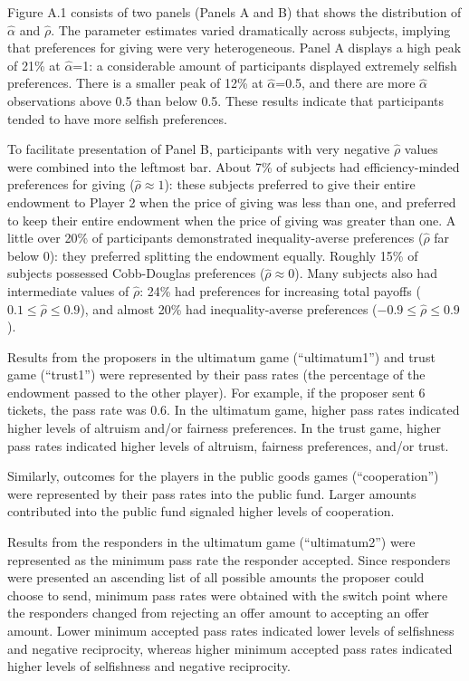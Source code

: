 \documentclass[12pt]{article}
\begin{document}
Figure A.1 consists of two panels (Panels A and B) that shows the distribution of  \(\hat{\alpha}\) and \(\hat{\rho}\). The parameter estimates varied dramatically across subjects, implying that preferences for giving were very heterogeneous. Panel A displays a high peak of 21\% at \(\hat{\alpha}\)=1: a considerable amount of participants displayed extremely selfish preferences. There is a smaller peak of 12\% at \(\hat{\alpha}\)=0.5, and there are more \(\hat{\alpha}\) observations above 0.5 than below 0.5. These results indicate that participants tended to have more selfish preferences. 

To facilitate presentation of Panel B, participants with very negative \(\hat{\rho}\) values were combined into the leftmost bar. About 7\% of subjects had efficiency-minded preferences for giving (\(\hat{\rho} \approx 1\)): these subjects preferred to give their entire endowment to Player 2 when the price of giving was less than one, and preferred to keep their entire endowment when the price of giving was greater than one. A little over 20\% of participants demonstrated inequality-averse preferences (\(\hat{\rho}\) far below 0): they preferred splitting the endowment equally. Roughly 15\% of subjects possessed Cobb-Douglas preferences (\(\hat{\rho} \approx 0\)). Many subjects also had intermediate values of \(\hat{\rho}\): 24\% had preferences for increasing total payoffs (\(0.1 \leq \hat{\rho} \leq 0.9\)), and almost 20\% had inequality-averse preferences (\(-0.9 \leq \hat{\rho} \leq 0.9\)).

Results from the proposers in the ultimatum game (``ultimatum1'') and trust game (``trust1'') were represented by their pass rates (the percentage of the endowment passed to the other player). For example, if the proposer sent 6 tickets, the pass rate was 0.6. In the ultimatum game, higher pass rates indicated higher levels of altruism and/or fairness preferences. In the trust game, higher pass rates indicated higher levels of altruism, fairness preferences, and/or trust. 

Similarly, outcomes for the players in the public goods games (``cooperation'') were represented by their pass rates into the public fund. Larger amounts contributed into the public fund signaled higher levels of cooperation.

Results from the responders in the ultimatum game (``ultimatum2'') were represented as the minimum pass rate the responder accepted. Since responders were presented an ascending list of all possible amounts the proposer could choose to send, minimum pass rates were obtained with the switch point where the responders changed from rejecting an offer amount to accepting an offer amount. Lower minimum accepted pass rates indicated lower levels of selfishness and negative reciprocity, whereas higher minimum accepted pass rates indicated higher levels of selfishness and negative reciprocity.
\end{document}
